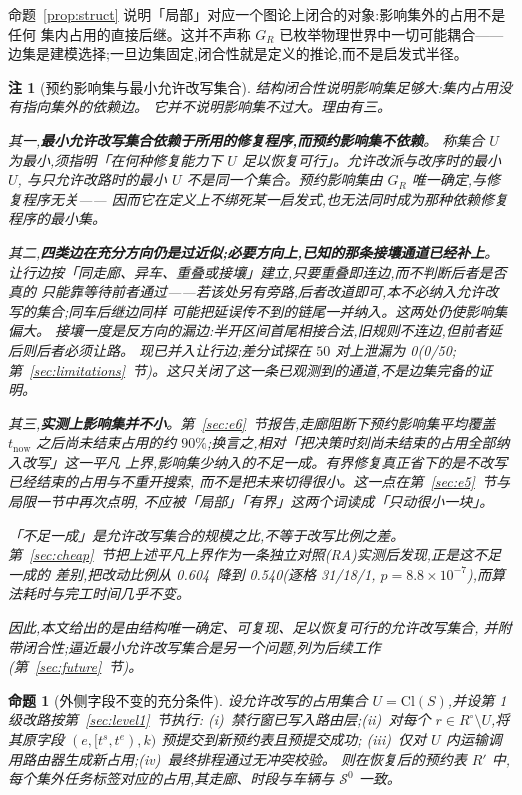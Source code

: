 \documentclass[manuscript,screen,review]{acmart}
\newcommand{\NPairs}{50}
\newcommand{\ResFracCheapRtwo}{0.540}
\newcommand{\ResFracAllFuture}{0.604}
\newcommand{\RAStabWTL}{31/18/1}     %
\newcommand{\RAStabP}{8.8\times10^{-7}}  %
\newcommand{\ProbeLeakPairs}{0/50}
\newcommand{\ProbeLeaks}{0}
\newtheorem{remark}{注}
\newtheorem{prop}{命题}
\begin{document}
命题~\ref{prop:struct} 说明「局部」对应一个图论上闭合的对象:影响集外的占用不是任何
集内占用的直接后继。这并不声称 \(G_R\) 已枚举物理世界中一切可能耦合——
边集是建模选择;一旦边集固定,闭合性就是定义的推论,而不是启发式半径。

\begin{remark}[预约影响集与最小允许改写集合]
\label{rem:minimality}
结构闭合性说明影响集足够大:集内占用没有指向集外的依赖边。
它并不说明影响集不过大。理由有三。

其一,\textbf{最小允许改写集合依赖于所用的修复程序,而预约影响集不依赖}。
称集合 \(U\) 为最小,须指明「在何种修复能力下 \(U\) 足以恢复可行」。允许改派与改序时的最小 \(U\),
与只允许改路时的最小 \(U\) 不是同一个集合。预约影响集由 \(G_R\) 唯一确定,与修复程序无关——
因而它在定义上不绑死某一启发式,也无法同时成为那种依赖修复程序的最小集。

其二,\textbf{四类边在充分方向仍是过近似;必要方向上,已知的那条接壤通道已经补上}。
让行边按「同走廊、异车、重叠或接壤」建立,只要重叠即连边,而不判断后者是否\emph{真的}
只能靠等待前者通过——若该处另有旁路,后者改道即可,本不必纳入允许改写的集合;同车后继边同样
可能把延误传不到的链尾一并纳入。这两处仍使影响集偏大。
接壤一度是反方向的漏边:半开区间首尾相接合法,旧规则不连边,但前者延后则后者必须让路。
现已并入让行边;差分试探在 \(\NPairs\) 对上泄漏为 \ProbeLeaks(\ProbeLeakPairs;
第~\ref{sec:limitations}~节)。这只关闭了这一条已观测到的通道,不是边集完备的证明。

其三,\textbf{实测上影响集并不小}。第~\ref{sec:e6}~节报告,走廊阻断下预约影响集平均覆盖
\(t_{\mathrm{now}}\) 之后尚未结束占用的约 \(90\%\);换言之,相对「把决策时刻尚未结束的占用全部纳入改写」这一平凡
上界,影响集少纳入的不足一成。有界修复真正省下的是\emph{不改写已经结束的占用}与\emph{不重开搜索},
而不是把未来切得很小。这一点在第~\ref{sec:e5}~节与局限一节中再次点明,
不应被「局部」「有界」这两个词读成「只动很小一块」。

「不足一成」是允许改写集合的\emph{规模}之比,不等于改写比例之差。
第~\ref{sec:cheap}~节把上述平凡上界作为一条独立对照(RA)实测后发现,正是这不足一成的
差别,把改动比例从 \ResFracAllFuture\ 降到 \ResFracCheapRtwo(逐格 \RAStabWTL,
\(p=\RAStabP\)),而算法耗时与完工时间几乎不变。

因此,本文给出的是由结构唯一确定、可复现、\emph{足以}恢复可行的允许改写集合,
并附带闭合性;逼近最小允许改写集合是另一个问题,列为后续工作
(第~\ref{sec:future}~节)。
\end{remark}

\begin{prop}[外侧字段不变的充分条件]
\label{prop:outside}
设允许改写的占用集合 \(U=\mathrm{Cl}(S)\),并设第 1 级改路按第~\ref{sec:level1}~节执行:
(i)~禁行窗已写入路由层;(ii)~对每个 \(r\in R^{\circ}\setminus U\),将其原字段
\((e,[t^s,t^e),k)\) 预提交到新预约表且预提交成功;
(iii)~仅对 \(U\) 内运输调用路由器生成新占用;(iv)~最终排程通过无冲突校验。
则在恢复后的预约表 \(R'\) 中,每个集外任务标签对应的占用,其走廊、时段与车辆与 \(\mathcal{S}^0\) 一致。
\end{prop}
\end{document}
